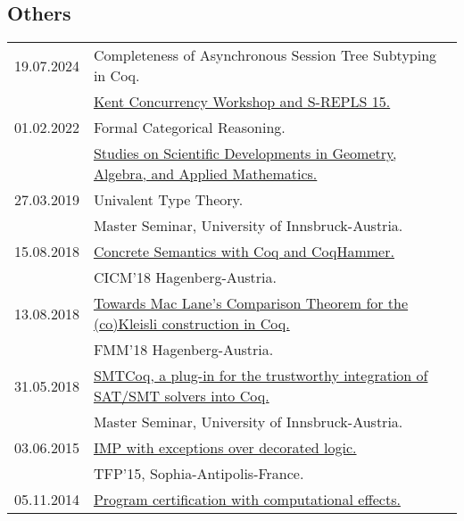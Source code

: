 \documentclass[a4paper,9pt]{article} %
\begin{document}
\subsection*{Others}
\begin{longtable}{ll}	
{\normalsize 19.07.2024} & {Completeness of Asynchronous Session Tree Subtyping in Coq.}\\
&
 \href{https://cw-srepls-24.github.io/}{Kent Concurrency Workshop and S-REPLS 15.}\\[0.25cm]

{\normalsize 01.02.2022} & {Formal Categorical Reasoning.}\\
&
 \href{https://etkinlik.ulakbim.gov.tr/event/12/}{Studies on Scientific Developments in Geometry, Algebra, and Applied
Mathematics.}\\[0.25cm]
{\normalsize 27.03.2019} & {Univalent Type Theory.}\\
& Master Seminar, University of Innsbruck-Austria.\\[0.25cm]
{\normalsize15.08.2018} & \href{https://cicm-conference.org/2018/slides/T16.pdf}{Concrete Semantics with Coq and
CoqHammer.}\\
& CICM'18 Hagenberg-Austria.\\[0.25cm]
{\normalsize13.08.2018} & \href{https://cicm-conference.org/2018/slides/FMM5.pdf}{Towards Mac Lane's Comparison Theorem for the (co)Kleisli construction in Coq.}\\
& FMM'18 Hagenberg-Austria.\\[0.25cm]
{\normalsize31.05.2018} & \href{http://cl-informatik.uibk.ac.at/teaching/ss18/ms2/slides/BE.pdf}{SMTCoq, a plug-in for the trustworthy integration of SAT/SMT solvers into Coq.}\\
& Master Seminar, University of Innsbruck-Austria.\\[0.25cm]
{\normalsize03.06.2015} & \href{ftp://ftp-sop.inria.fr/indes/TFP15/TFP2015_talk_6.pdf}{ IMP with exceptions over decorated logic.} \\
& TFP'15, Sophia-Antipolis-France.\\[0.25cm]
{\normalsize05.11.2014} & \href{http://www.lifl.fr/jncf2014/files/slides/ekici.pdf}{Program certification with computational effects.}\\

\end{longtable}
\end{document}
